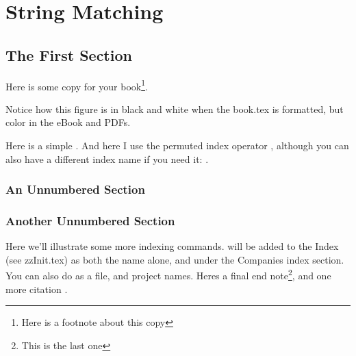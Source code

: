 \chapter{String Matching}
\label{abody}%

\section{The First Section}

Here is some copy for your book\footnote{Here is a footnote about this copy}.



Notice how this figure is in black and white when the book.tex is formatted, but color in the eBook and PDFs.

Here is a simple . And here I use the permuted index operator , although you can also have a different index name if you need it: .

\subsection*{An Unnumbered Section}

\lipsum[9-15]

\subsection*{Another Unnumbered Section}

\lipsum[16-22]

Here we'll illustrate some more indexing commands.  will be added to the Index (see zzInit.tex) as both the name alone,
and under the Companies index section. You can also do  as a file, and  project names. Heres a final end note\footnote{This is the last one}, and one more citation \cite{Pfister2013}.

